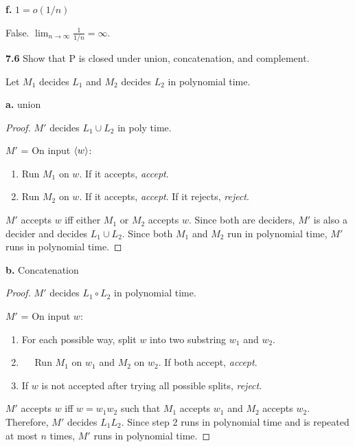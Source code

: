 \textbf{f.} $1 = o(1 / n)$
\begin{mdframed}
False.  $\lim_{n\rightarrow\infty} \frac{1}{1/n} = \infty$.
\end{mdframed}

\textbf{7.6} Show that P is closed under union, concatenation, and complement.
\label{exe:P_CLOSURE}

\begin{mdframed}
Let $M_1$ decides $L_1$ and $M_2$ decides $L_2$ in polynomial time.
\end{mdframed}

\textbf{a.} union
\begin{mdframed}
\begin{proof}
$M'$ decides $L_1 \cup L_2$ in poly time.

\medskip
$M'$ = On input $\langle{w}\rangle$:
\begin{enumerate}
\item Run $M_1$ on $w$. If it accepts, \textit{accept}.
\item Run $M_2$ on $w$. If it accepts, \textit{accept}. If it rejects, \textit{reject}.
\end{enumerate}

$M'$ accepts $w$ iff either $M_1$ or $M_2$ accepts $w$. Since both are deciders, $M'$ is also a decider and decides $L_1 \cup L_2$. Since both $M_1$ and $M_2$ run in polynomial time, $M'$ runs in polynomial time.
\end{proof}
\end{mdframed}

\textbf{b.} Concatenation

\begin{mdframed}
\begin{proof}
$M'$ decides $L_1 \circ L_2$ in polynomial time.

\medskip
$M'$ = On input $w$:
\begin{enumerate}
\item For each possible way, split $w$ into two substring $w_1$ and $w_2$.
\item $\quad$ Run $M_1$ on $w_1$ and $M_2$ on $w_2$. If both accept, \textit{accept}.
\item If $w$ is not accepted after trying all possible splits, \textit{reject}.
\end{enumerate}

$M'$ accepts $w$ iff $w = w_1 w_2$ such that $M_1$ accepts $w_1$ and $M_2$ accepts $w_2$. Therefore, $M'$ decides $L_1L_2$. Since step 2 runs in polynomial time and is repeated at most $n$ times, $M'$ runs in polynomial time.
\end{proof}
\end{mdframed}

